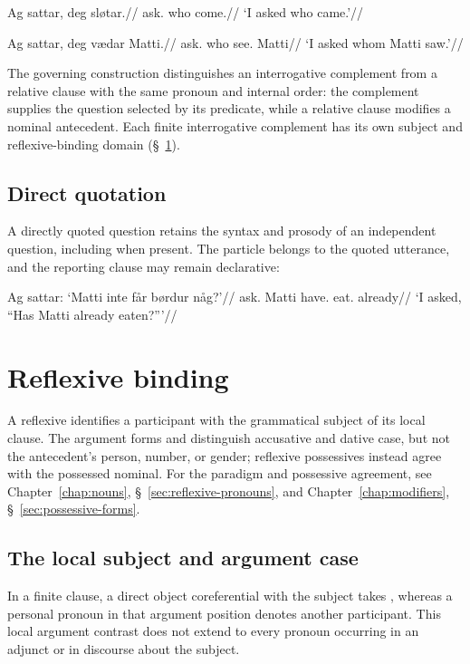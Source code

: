 \pex
\begingl
\gla Ag sattar, deg sløtar.//
\glb \First{}\Sg{} ask.\Pst{} who come.\Pst{}//
\glft `I asked who came.'//
\endgl
\xe

\pex
\begingl
\gla Ag sattar, deg vædar Matti.//
\glb \First{}\Sg{} ask.\Pst{} who see.\Pst{} Matti//
\glft `I asked whom Matti saw.'//
\endgl
\xe

The governing construction distinguishes an interrogative complement from a relative clause with the same pronoun and internal order: the complement supplies the question selected by its predicate, while a relative clause modifies a nominal antecedent. Each finite interrogative complement has its own subject and reflexive-binding domain (\S~\ref{sec:reflexive-binding}).

\subsection{Direct quotation}
\label{sec:quoted-questions}

A directly quoted question retains the syntax and prosody of an independent question, including  when present. The particle belongs to the quoted utterance, and the reporting clause may remain declarative:

\pex
\begingl
\gla Ag sattar: `Matti inte får børdur någ?'//
\glb \First{}\Sg{} ask.\Pst{} Matti \Q{} have.\Pres{} eat.\PstP{} already//
\glft `I asked, ``Has Matti already eaten?'''//
\endgl
\xe

\section{Reflexive binding}
\label{sec:reflexive-binding}

A reflexive identifies a participant with the grammatical subject of its local clause. The argument forms  and  distinguish accusative and dative case, but not the antecedent's person, number, or gender; reflexive possessives instead agree with the possessed nominal. For the paradigm and possessive agreement, see Chapter~\ref{chap:nouns}, \S~\ref{sec:reflexive-pronouns}, and Chapter~\ref{chap:modifiers}, \S~\ref{sec:possessive-forms}.

\subsection{The local subject and argument case}
\label{sec:local-reflexive-arguments}

In a finite clause, a direct object coreferential with the subject takes , whereas a personal pronoun in that argument position denotes another participant. This local argument contrast does not extend to every pronoun occurring in an adjunct or in discourse about the subject.


